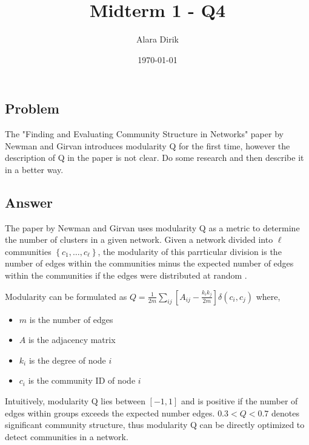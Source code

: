 \documentclass{article}
\title{Midterm 1 - Q4}
\author{Alara Dirik}
\date\today
\begin{document}
\maketitle 

\subsection*{Problem}
The "Finding and Evaluating Community Structure in Networks" paper by Newman and Girvan {\bf \cite{Newman2004FindingAE}} introduces modularity Q for the first time, however the description of Q in the paper is not clear. Do some research and then describe it in a better way.


\subsection*{Answer}

The paper by Newman and Girvan uses modularity Q as a metric to determine the number of clusters in a given network. Given a network divided into $\ell$ communities $\left\{c_{1}, \ldots, c_{\ell}\right\}$, the modularity of this parrticular division is the number of edges within the communities minus the expected number of edges within the communities if the edges were distributed at random {\bf \cite{Newman2016CommunityDI}}. \newline

\noindent
Modularity can be formulated as 
$Q=\frac{1}{2 m} \sum_{i j}\left[A_{i j}-\frac{k_{i} k_{j}}{2 m}\right] \delta\left(c_{i}, c_{j}\right)$ where,

\begin{itemize}
    \item $m$ is the number of edges
    \item $A$ is the adjacency matrix
    \item $k_{i}$ is the degree of node $i$
    \item $c_{i}$ is the community ID of node $i$
\end{itemize}

\noindent
Intuitively, modularity Q lies between $[-1, 1]$ and is positive if the number of edges within groups exceeds the expected number edges. $0.3 < Q < 0.7$ denotes significant community structure, thus modularity Q can be directly optimized to detect communities in a network.

\nocite{*}


\end{document}
